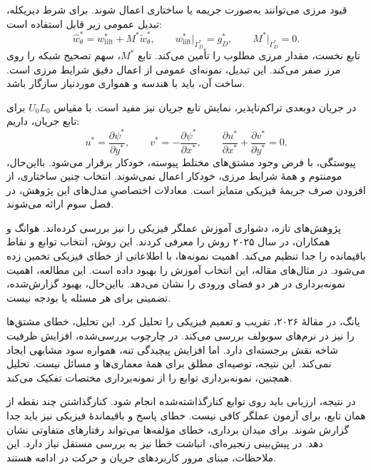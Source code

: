 قیود مرزی می‌توانند به‌صورت جریمه یا ساختاری اعمال شوند.
برای شرط دیریکله، تبدیل عمومی زیر قابل استفاده است:
\begin{equation}
\widehat{w}^{*}_{\theta}
=w^{*}_{\mathrm{lift}}+M^{*}\widetilde{w}^{*}_{\theta},
\qquad
w^{*}_{\mathrm{lift}}\big|_{\Gamma_D^{*}}=g_D^{*},
\qquad M^{*}\big|_{\Gamma_D^{*}}=0.
\label{eq:lit-operator-hard-boundary}
\end{equation}
تابع نخست، مقدار مرزی مطلوب را تأمین می‌کند.
تابع $M^{*}$، سهم تصحیح شبکه را روی مرز صفر می‌کند.
این تبدیل، نمونه‌ای عمومی از اعمال دقیق شرایط مرزی است.
ساخت آن، باید با هندسه و همواری موردنیاز سازگار باشد.
\cite{SukumarSrivastava2022}

در جریان دوبعدی تراکم‌ناپذیر، نمایش تابع جریان نیز مفید است.
با مقیاس $U_0L_0$ برای تابع جریان، داریم:
\begin{equation}
u^{*}=\frac{\partial\psi^{*}}{\partial y^{*}},
\qquad
v^{*}=-\frac{\partial\psi^{*}}{\partial x^{*}},
\qquad
\frac{\partial u^{*}}{\partial x^{*}}
+\frac{\partial v^{*}}{\partial y^{*}}=0.
\label{eq:lit-operator-streamfunction}
\end{equation}
پیوستگی، با فرض وجود مشتق‌های مختلط پیوسته، خودکار برقرار می‌شود.
بااین‌حال، مومنتوم و همهٔ شرایط مرزی، خودکار اعمال نمی‌شوند.
انتخاب چنین ساختاری، از افزودن صرف جریمهٔ فیزیکی متمایز است.
معادلات اختصاصیِ مدل‌های این پژوهش، در فصل سوم ارائه می‌شوند.

پژوهش‌های تازه، دشواری آموزش عملگر فیزیکی را نیز بررسی کرده‌اند.
هوانگ و همکاران، در سال ۲۰۲۵ روش  را معرفی کردند.
این روش، انتخاب توابع و نقاط باقیمانده را جدا تنظیم می‌کند.
اهمیت نمونه‌ها، با اطلاعاتی از خطای فیزیکی تخمین زده می‌شود.
در مثال‌های مقاله، این انتخاب آموزش را بهبود داده است.
این مطالعه، اهمیت نمونه‌برداری در هر دو فضای ورودی را نشان می‌دهد.
بااین‌حال، بهبود گزارش‌شده، تضمینی برای هر مسئله یا بودجه نیست.
\cite{Huang2025DONIS}

یانگ، در مقالهٔ ۲۰۲۶، تقریب و تعمیم  فیزیکی را تحلیل کرد.
این تحلیل، خطای مشتق‌ها را نیز در نرم‌های سوبولف بررسی می‌کند.
در چارچوب بررسی‌شده، افزایش ظرفیت شاخه نقش برجسته‌ای دارد.
اما افزایش پیچیدگی تنه، همواره سود مشابهی ایجاد نمی‌کند.
این نتیجه، توصیه‌ای مطلق برای همهٔ معماری‌ها و مسائل نیست.
تحلیل همچنین، نمونه‌برداری توابع را از نمونه‌برداری مختصات تفکیک می‌کند.
\cite{Yang2026PIDeepONet}

در نتیجه، ارزیابی باید روی توابع کنارگذاشته‌شده انجام شود.
کنارگذاشتن چند نقطه از همان تابع، برای آزمون عملگر کافی نیست.
خطای پاسخ و باقیماندهٔ فیزیکی نیز باید جدا گزارش شوند.
برای میدان برداری، خطای مؤلفه‌ها می‌تواند رفتارهای متفاوتی نشان دهد.
در پیش‌بینی زنجیره‌ای، انباشت خطا نیز به بررسی مستقل نیاز دارد.
این ملاحظات، مبنای مرور کاربردهای جریان و حرکت در ادامه هستند.

